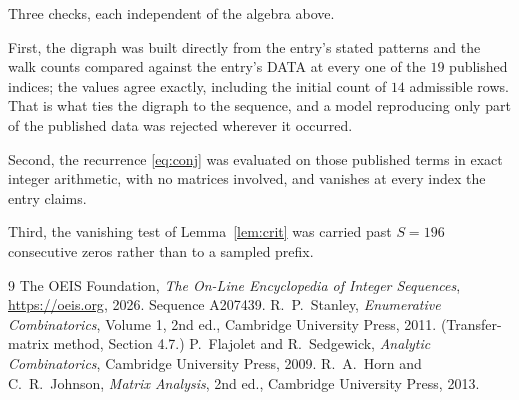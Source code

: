 \documentclass[11pt,a4paper]{article}
\theoremstyle{plain}
\theoremstyle{definition}
\begin{document}
Three checks, each independent of the algebra above.

First, the digraph was built directly from the entry's stated patterns and the walk counts
compared against the entry's DATA at every one of the $19$ published indices; the
values agree exactly, including the initial count of $14$ admissible rows. That is
what ties the digraph to the sequence, and a model reproducing only part of the published
data was rejected wherever it occurred.

Second, the recurrence \eqref{eq:conj} was evaluated on those published terms in exact
integer arithmetic, with no matrices involved, and vanishes at every index the entry claims.

Third, the vanishing test of Lemma~\ref{lem:crit} was carried past $S=196$ consecutive
zeros rather than to a sampled prefix.

\begin{thebibliography}{9}
 The OEIS Foundation, \emph{The On-Line Encyclopedia of Integer
Sequences}, \url{https://oeis.org}, 2026. Sequence A207439.
 R.~P.~Stanley, \emph{Enumerative Combinatorics}, Volume 1, 2nd ed.,
Cambridge University Press, 2011. (Transfer-matrix method, Section 4.7.)
 P.~Flajolet and R.~Sedgewick, \emph{Analytic Combinatorics}, Cambridge
University Press, 2009.
 R.~A.~Horn and C.~R.~Johnson, \emph{Matrix Analysis}, 2nd ed., Cambridge
University Press, 2013.
\end{thebibliography}
\end{document}
